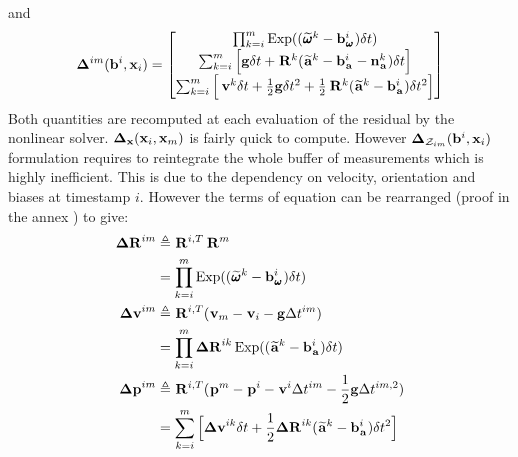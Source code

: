 %
and 
%
\begin{align}
    \bfDelta^{im}(\bias^i, \bfx_i) = 
    \begin{bmatrix}
    \prod_{k=i}^{m} \Exp((\angvelm{}{}^k - \bias_{\angvel{}{}}^i)\dt)  \\
    \sum_{k=i}^{m} \Big[\grav \dt + \Rot{}{}^{k}(\accm{}{}^k - \bias_{\acc{}{}}^i - \noise_{\acc{}{}}^k)\dt \Big]  \\
    \sum_{k=i}^{m} \Big[\vel{}{}^{k}\dt + \frac{1}{2}\grav \dt^2 
    + \frac{1}{2}\Rot{}{}^{k}(\accm{}{}^k - \bias_{\acc{}{}}^i)\dt^2 \Big]
    \end{bmatrix}
    \label{eq:IMUIntim}
\end{align}
%
Both quantities are recomputed at each evaluation of the residual by the nonlinear solver. ${\bm \Delta}_{{\bf x}}({\bf x}_i, {\bf x}_m)$ is fairly quick to compute.
However ${\bm \Delta}_{\mathcal{Z}_{im}}({\bf b}^i, {\bf x}_i)$ formulation requires to reintegrate the whole buffer of measurements which
is highly inefficient. This is due to the dependency on velocity, orientation and biases at timestamp $i$. However the terms of equation  can 
be rearranged (proof in the annex ) to give:
%
%
\begin{equation}
    \begin{split}
    \DR^{im} &\triangleq  \Rot{}{}^{i,T} \Rot{}{}^{m} \\
             &=  \prod_{k=i}^{m} \Exp((\angvelm{}{}^k - \bias_{\angvel{}{}}^i)\dt) \\
    \Dv^{im} &\triangleq \Rot{}{}^{i,T} (\vel{}{m} - \vel{}{i} - \grav \Dt^{im}) \\
             &= \prod_{k=i}^{m} \DR^{ik} \Exp((\accm{}{}^k - \bias_{\acc{}{}}^i)\dt)  \\
    \Dp^{im} &\triangleq \Rot{}{}^{i,T}(\posi{}{}^m - \posi{}{}^i - \vel{}{}^i \Dt^{im} - \frac{1}{2} \grav \Dt^{im,2}) \\
             &= \sum_{k=i}^{m} \Big[\Dv^{ik}\dt +  \frac{1}{2} \DR^{ik} (\accm{}{}^k - \bias_{\acc{}{}}^i)\dt^2 \Big]
    \end{split}
    \label{eq:IMUPreintij}
\end{equation}
